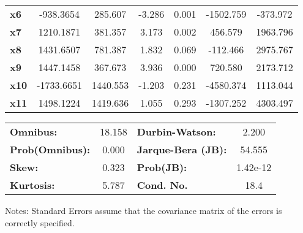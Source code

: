 \begin{center}
\begin{tabular}{lcccccc}
\textbf{x6}    &    -938.3654  &      285.607     &    -3.286  &         0.001        &    -1502.759    &     -373.972     \\
\textbf{x7}    &    1210.1871  &      381.357     &     3.173  &         0.002        &      456.579    &     1963.796     \\
\textbf{x8}    &    1431.6507  &      781.387     &     1.832  &         0.069        &     -112.466    &     2975.767     \\
\textbf{x9}    &    1447.1458  &      367.673     &     3.936  &         0.000        &      720.580    &     2173.712     \\
\textbf{x10}   &   -1733.6651  &     1440.553     &    -1.203  &         0.231        &    -4580.374    &     1113.044     \\
\textbf{x11}   &    1498.1224  &     1419.636     &     1.055  &         0.293        &    -1307.252    &     4303.497     \\
\bottomrule
\end{tabular}
\begin{tabular}{lclc}
\textbf{Omnibus:}       & 18.158 & \textbf{  Durbin-Watson:     } &    2.200  \\
\textbf{Prob(Omnibus):} &  0.000 & \textbf{  Jarque-Bera (JB):  } &   54.555  \\
\textbf{Skew:}          &  0.323 & \textbf{  Prob(JB):          } & 1.42e-12  \\
\textbf{Kurtosis:}      &  5.787 & \textbf{  Cond. No.          } &     18.4  \\
\bottomrule
\end{tabular}
\end{center}

Notes: \newline
 [1] Standard Errors assume that the covariance matrix of the errors is correctly specified.